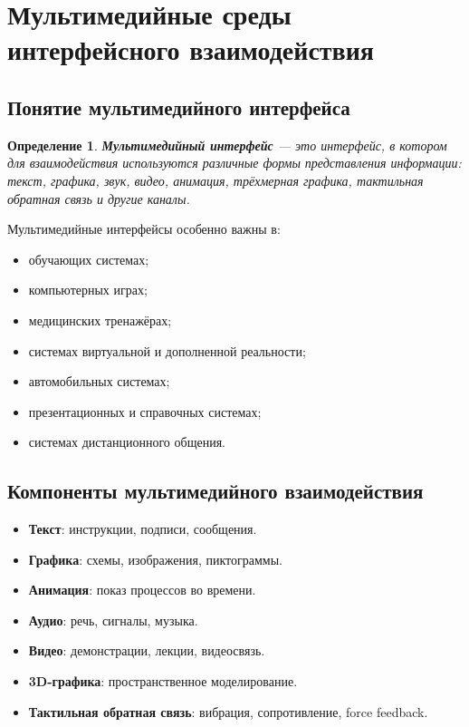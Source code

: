 \documentclass[12pt,a4paper]{article}
\newtheorem{definition}{Определение}
\begin{document}
\section{Мультимедийные среды интерфейсного взаимодействия}

\subsection{Понятие мультимедийного интерфейса}

\begin{definition}
\textbf{Мультимедийный интерфейс} --- это интерфейс, в котором для взаимодействия используются различные формы представления информации: текст, графика, звук, видео, анимация, трёхмерная графика, тактильная обратная связь и другие каналы.
\end{definition}

Мультимедийные интерфейсы особенно важны в:
\begin{itemize}
    \item обучающих системах;
    \item компьютерных играх;
    \item медицинских тренажёрах;
    \item системах виртуальной и дополненной реальности;
    \item автомобильных системах;
    \item презентационных и справочных системах;
    \item системах дистанционного общения.
\end{itemize}

\subsection{Компоненты мультимедийного взаимодействия}

\begin{itemize}
    \item \textbf{Текст}: инструкции, подписи, сообщения.
    \item \textbf{Графика}: схемы, изображения, пиктограммы.
    \item \textbf{Анимация}: показ процессов во времени.
    \item \textbf{Аудио}: речь, сигналы, музыка.
    \item \textbf{Видео}: демонстрации, лекции, видеосвязь.
    \item \textbf{3D-графика}: пространственное моделирование.
    \item \textbf{Тактильная обратная связь}: вибрация, сопротивление, force feedback.
\end{itemize}
\end{document}
